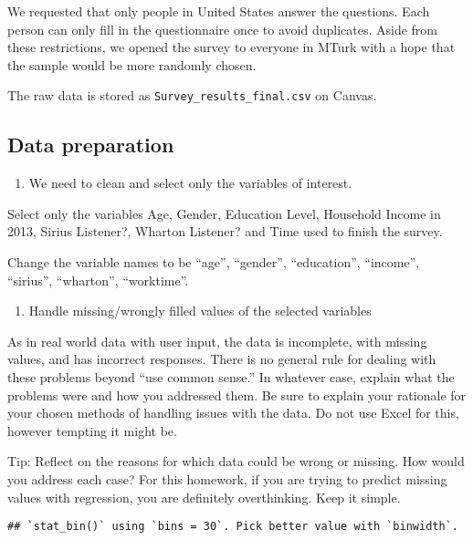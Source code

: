 \documentclass[
]{article}
\providecommand{\tightlist}{%
  \setlength{\itemsep}{0pt}\setlength{\parskip}{0pt}}
\begin{document}
We requested that only people in United States answer the questions.
Each person can only fill in the questionnaire once to avoid duplicates.
Aside from these restrictions, we opened the survey to everyone in MTurk
with a hope that the sample would be more randomly chosen.

The raw data is stored as \texttt{Survey\_results\_final.csv} on Canvas.

\hypertarget{data-preparation}{%
\subsection{Data preparation}\label{data-preparation}}

\begin{enumerate}
\def\labelenumi{\roman{enumi}.}
\tightlist
\item
  We need to clean and select only the variables of interest.
\end{enumerate}

Select only the variables Age, Gender, Education Level, Household Income
in 2013, Sirius Listener?, Wharton Listener? and Time used to finish the
survey.

Change the variable names to be ``age'', ``gender'', ``education'',
``income'', ``sirius'', ``wharton'', ``worktime''.

\begin{enumerate}
\def\labelenumi{\roman{enumi}.}
\setcounter{enumi}{1}
\tightlist
\item
  Handle missing/wrongly filled values of the selected variables
\end{enumerate}

As in real world data with user input, the data is incomplete, with
missing values, and has incorrect responses. There is no general rule
for dealing with these problems beyond ``use common sense.'' In whatever
case, explain what the problems were and how you addressed them. Be sure
to explain your rationale for your chosen methods of handling issues
with the data. Do not use Excel for this, however tempting it might be.

Tip: Reflect on the reasons for which data could be wrong or missing.
How would you address each case? For this homework, if you are trying to
predict missing values with regression, you are definitely overthinking.
Keep it simple.

\begin{verbatim}
## `stat_bin()` using `bins = 30`. Pick better value with `binwidth`.
\end{verbatim}
\end{document}
